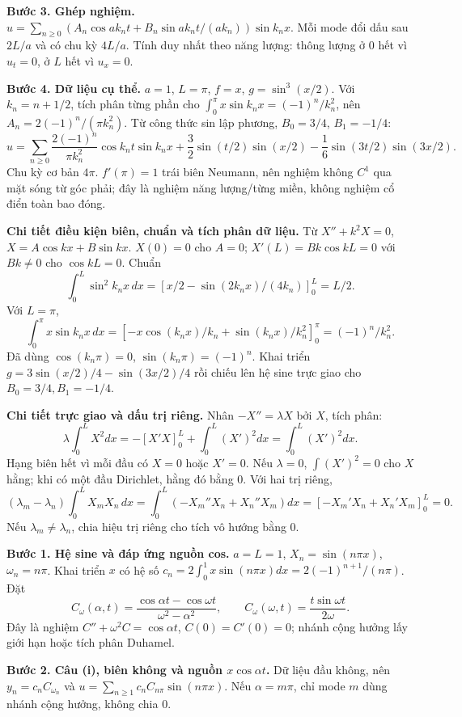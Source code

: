 \textbf{Bước 3. Ghép nghiệm.} $u=\sum_{n\ge0}(A_n\cos ak_nt+B_n\sin ak_nt/(ak_n))\sin k_nx$. Mỗi mode đổi dấu sau $2L/a$ và có chu kỳ $4L/a$. Tính duy nhất theo năng lượng: thông lượng ở $0$ hết vì $u_t=0$, ở $L$ hết vì $u_x=0$.

\textbf{Bước 4. Dữ liệu cụ thể.} $a=1$, $L=\pi$, $f=x$, $g=\sin^3(x/2)$. Với $k_n=n+1/2$, tích phân từng phần cho $\int_0^\pi x\sin k_nx=(-1)^n/k_n^2$, nên $A_n=2(-1)^n/(\pi k_n^2)$. Từ công thức sin lập phương, $B_0=3/4$, $B_1=-1/4$:
\[u=\sum_{n\ge0}\frac{2(-1)^n}{\pi k_n^2}\cos k_nt\sin k_nx
+\frac32\sin(t/2)\sin(x/2)-\frac16\sin(3t/2)\sin(3x/2).\]
Chu kỳ cơ bản $4\pi$. $f'(\pi)=1$ trái biên Neumann, nên nghiệm không $C^1$ qua mặt sóng từ góc phải; đây là nghiệm năng lượng/từng miền, không nghiệm cổ điển toàn bao đóng.

\textbf{Chi tiết điều kiện biên, chuẩn và tích phân dữ liệu.} Từ $X''+k^2X=0$, $X=A\cos kx+B\sin kx$. $X(0)=0$ cho $A=0$; $X'(L)=Bk\cos kL=0$ với $Bk\ne0$ cho $\cos kL=0$. Chuẩn
\[\int_0^L\sin^2k_nx\,dx=\left[x/2-\sin(2k_nx)/(4k_n)\right]_0^L=L/2.\]
Với $L=\pi$,
\[\int_0^\pi x\sin k_nx\,dx=
\left[-x\cos(k_nx)/k_n+\sin(k_nx)/k_n^2\right]_0^\pi
=(-1)^n/k_n^2.\]
Đã dùng $\cos(k_n\pi)=0$, $\sin(k_n\pi)=(-1)^n$. Khai triển $g=3\sin(x/2)/4-\sin(3x/2)/4$ rồi chiếu lên hệ sine trực giao cho $B_0=3/4,B_1=-1/4$.

\textbf{Chi tiết trực giao và dấu trị riêng.} Nhân $-X''=\lambda X$ bởi $X$, tích phân:
\[\lambda\int_0^LX^2dx=-[X'X]_0^L+\int_0^L(X')^2dx=\int_0^L(X')^2dx.\]
Hạng biên hết vì mỗi đầu có $X=0$ hoặc $X'=0$. Nếu $\lambda=0$, $\int(X')^2=0$ cho $X$ hằng; khi có một đầu Dirichlet, hằng đó bằng $0$. Với hai trị riêng,
\[(\lambda_m-\lambda_n)\int_0^LX_mX_n\,dx
=\int_0^L(-X_m''X_n+X_n''X_m)dx
=[-X_m'X_n+X_n'X_m]_0^L=0.\]
Nếu $\lambda_m\ne\lambda_n$, chia hiệu trị riêng cho tích vô hướng bằng $0$.

\textbf{Bước 1. Hệ sine và đáp ứng nguồn cos.} $a=L=1$, $X_n=\sin(n\pi x)$, $\omega_n=n\pi$. Khai triển $x$ có hệ số $c_n=2\int_0^1x\sin(n\pi x)dx=2(-1)^{n+1}/(n\pi)$. Đặt
\[C_\omega(\alpha,t)=\frac{\cos\alpha t-\cos\omega t}{\omega^2-\alpha^2},\qquad
C_\omega(\omega,t)=\frac{t\sin\omega t}{2\omega}.\]
Đây là nghiệm $C''+\omega^2C=\cos\alpha t$, $C(0)=C'(0)=0$; nhánh cộng hưởng lấy giới hạn hoặc tích phân Duhamel.

\textbf{Bước 2. Câu (i), biên không và nguồn $x\cos\alpha t$.} Dữ liệu đầu không, nên $y_n=c_nC_{\omega_n}$ và $u=\sum_{n\ge1}c_nC_{n\pi}\sin(n\pi x)$. Nếu $\alpha=m\pi$, chỉ mode $m$ dùng nhánh cộng hưởng, không chia $0$.

